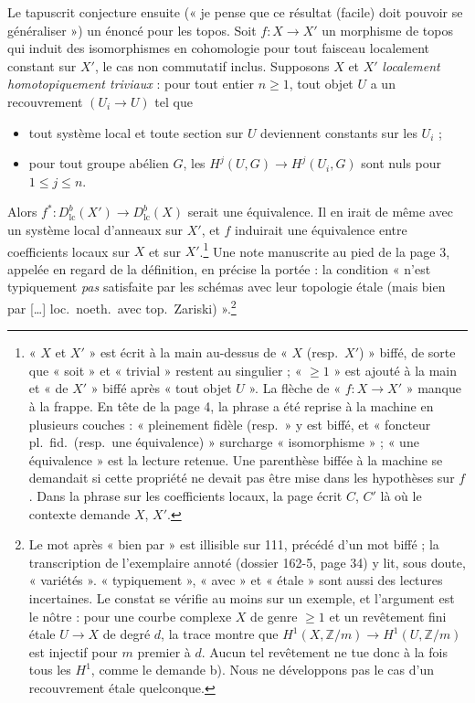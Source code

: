 \documentclass[11pt,a4paper]{article}
\begin{document}
Le tapuscrit conjecture ensuite (« je pense que ce résultat (facile) doit
pouvoir se généraliser ») un énoncé pour les topos. Soit $f : X \to X'$ un
morphisme de topos qui induit des isomorphismes en cohomologie pour tout
faisceau localement constant sur $X'$, le cas non commutatif inclus. Supposons
$X$ et $X'$ \emph{localement homotopiquement triviaux} : pour tout entier $n
\geq 1$, tout objet $U$ a un recouvrement $(U_i \to U)$ tel que
\begin{itemize}
  \item[a)] tout système local et toute section sur $U$ deviennent constants
  sur les $U_i$ ;
  \item[b)] pour tout groupe abélien $G$, les $H^{j}(U, G) \to H^{j}(U_i, G)$
  sont nuls pour $1 \leq j \leq n$.
\end{itemize}
Alors $f^{*} : D^{b}_{\mathrm{lc}}(X') \to D^{b}_{\mathrm{lc}}(X)$ serait une
équivalence. Il en irait de même avec un système local d'anneaux sur $X'$, et
$f$ induirait une équivalence entre coefficients locaux sur $X$ et sur
$X'$.\footnote{« $X$ et $X'$ » est écrit à la main au-dessus de « $X$ (resp.\
$X'$) » biffé, de sorte que « soit » et « trivial » restent au singulier ;
« $\geq 1$ » est ajouté à la main et « de $X'$ » biffé après « tout objet
$U$ ». La flèche de « $f : X \to X'$ » manque à la frappe. En tête de la page
4, la phrase a été reprise à la machine en plusieurs couches : « pleinement
fidèle (resp.\ » y est biffé, et « foncteur pl.\ fid.\ (resp.\ une
équivalence) » surcharge « isomorphisme » ; « une équivalence » est la lecture
retenue. Une parenthèse biffée à la machine se demandait si cette propriété ne
devait pas être mise dans les hypothèses sur $f$. Dans la phrase sur les
coefficients locaux, la page écrit $C$, $C'$ là où le contexte demande $X$,
$X'$.} Une note manuscrite au pied de la page 3, appelée en regard de la
définition, en précise la portée : la condition « n'est typiquement \emph{pas}
satisfaite par les schémas avec leur topologie étale (mais bien par […] loc.\
noeth.\ avec top.\ Zariski) ».\footnote{Le mot après « bien par » est
illisible sur 111, précédé d'un mot biffé ; la transcription de l'exemplaire
annoté (dossier 162-5, page 34) y lit, sous doute, « variétés ».
« typiquement », « avec » et « étale » sont aussi des lectures incertaines.
Le constat se vérifie au moins sur un exemple, et l'argument est le nôtre :
pour une courbe complexe $X$ de genre $\geq 1$ et un revêtement fini étale $U
\to X$ de degré $d$, la trace montre que $H^{1}(X, \mathbb{Z}/m) \to H^{1}(U,
\mathbb{Z}/m)$ est injectif pour $m$ premier à $d$. Aucun tel revêtement ne tue
donc à la fois tous les $H^{1}$, comme le demande b). Nous ne développons pas
le cas d'un recouvrement étale quelconque.}
\end{document}
